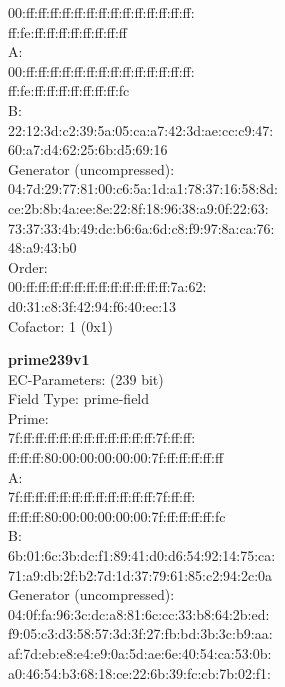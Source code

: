     00:ff:ff:ff:ff:ff:ff:ff:ff:ff:ff:ff:ff:ff:ff:\\
    ff:fe:ff:ff:ff:ff:ff:ff:ff:ff\\
A:   \\
    00:ff:ff:ff:ff:ff:ff:ff:ff:ff:ff:ff:ff:ff:ff:\\
    ff:fe:ff:ff:ff:ff:ff:ff:ff:fc\\
B:   \\
    22:12:3d:c2:39:5a:05:ca:a7:42:3d:ae:cc:c9:47:\\
    60:a7:d4:62:25:6b:d5:69:16\\
Generator (uncompressed):\\
    04:7d:29:77:81:00:c6:5a:1d:a1:78:37:16:58:8d:\\
    ce:2b:8b:4a:ee:8e:22:8f:18:96:38:a9:0f:22:63:\\
    73:37:33:4b:49:dc:b6:6a:6d:c8:f9:97:8a:ca:76:\\
    48:a9:43:b0\\
Order: \\
    00:ff:ff:ff:ff:ff:ff:ff:ff:ff:ff:ff:ff:7a:62:\\
    d0:31:c8:3f:42:94:f6:40:ec:13\\
Cofactor:  1 (0x1)\\
\item \textbf{ prime239v1 }\\
EC-Parameters: (239 bit)\\
Field Type: prime-field\\
Prime:\\
    7f:ff:ff:ff:ff:ff:ff:ff:ff:ff:ff:ff:7f:ff:ff:\\
    ff:ff:ff:80:00:00:00:00:00:7f:ff:ff:ff:ff:ff\\
A:   \\
    7f:ff:ff:ff:ff:ff:ff:ff:ff:ff:ff:ff:7f:ff:ff:\\
    ff:ff:ff:80:00:00:00:00:00:7f:ff:ff:ff:ff:fc\\
B:   \\
    6b:01:6c:3b:dc:f1:89:41:d0:d6:54:92:14:75:ca:\\
    71:a9:db:2f:b2:7d:1d:37:79:61:85:c2:94:2c:0a\\
Generator (uncompressed):\\
    04:0f:fa:96:3c:dc:a8:81:6c:cc:33:b8:64:2b:ed:\\
    f9:05:c3:d3:58:57:3d:3f:27:fb:bd:3b:3c:b9:aa:\\
    af:7d:eb:e8:e4:e9:0a:5d:ae:6e:40:54:ca:53:0b:\\
    a0:46:54:b3:68:18:ce:22:6b:39:fc:cb:7b:02:f1:\\
